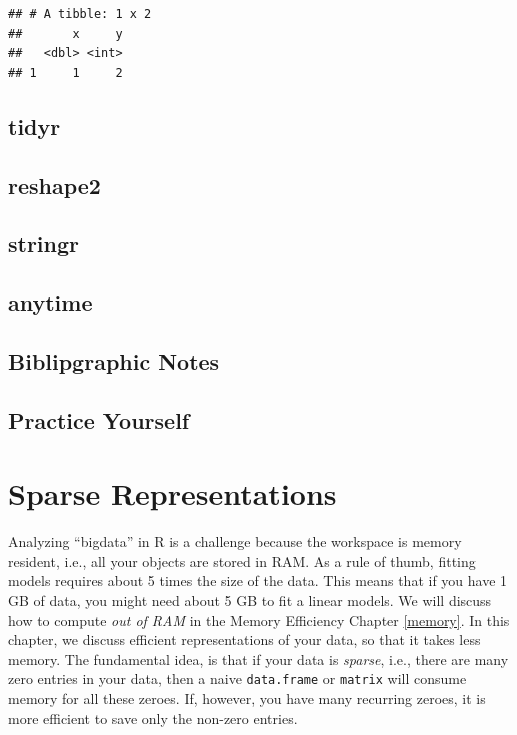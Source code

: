 \documentclass[]{book}
\theoremstyle{definition}
\theoremstyle{definition}
\theoremstyle{definition}
\theoremstyle{remark}
\begin{document}
\begin{verbatim}
## # A tibble: 1 x 2
##       x     y
##   <dbl> <int>
## 1     1     2
\end{verbatim}

\section{tidyr}\label{tidyr}

\section{reshape2}\label{reshape2}

\section{stringr}\label{stringr}

\section{anytime}\label{anytime}

\section{Biblipgraphic Notes}\label{biblipgraphic-notes-1}

\section{Practice Yourself}\label{practice-yourself-10}

\chapter{Sparse Representations}\label{sparse}

Analyzing ``bigdata'' in R is a challenge because the workspace is
memory resident, i.e., all your objects are stored in RAM. As a rule of
thumb, fitting models requires about 5 times the size of the data. This
means that if you have 1 GB of data, you might need about 5 GB to fit a
linear models. We will discuss how to compute \emph{out of RAM} in the
Memory Efficiency Chapter \ref{memory}. In this chapter, we discuss
efficient representations of your data, so that it takes less memory.
The fundamental idea, is that if your data is \emph{sparse}, i.e., there
are many zero entries in your data, then a naive \texttt{data.frame} or
\texttt{matrix} will consume memory for all these zeroes. If, however,
you have many recurring zeroes, it is more efficient to save only the
non-zero entries.
\end{document}
